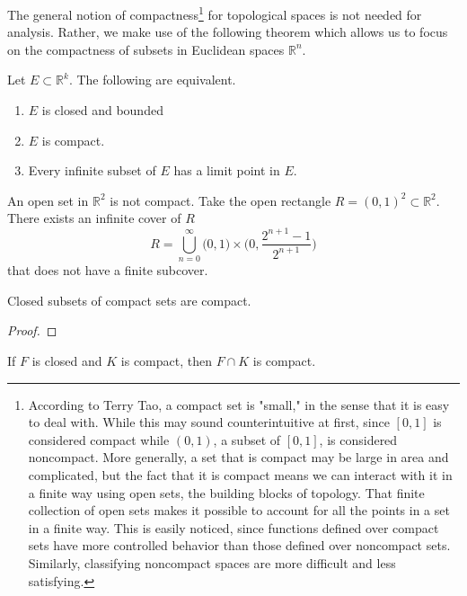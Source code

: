 \documentclass{article}
\begin{document}
    The general notion of compactness\footnote{According to Terry Tao, a compact set is "small," in the sense that it is easy to deal with. While this may sound counterintuitive at first, since $[0,1]$ is considered compact while $(0,1)$, a subset of $[0,1]$, is considered noncompact. More generally, a set that is compact may be large in area and complicated, but the fact that it is compact means we can interact with it in a finite way using open sets, the building blocks of topology. That finite collection of open sets makes it possible to account for all the points in a set in a finite way. This is easily noticed, since functions defined over compact sets have more controlled behavior than those defined over noncompact sets. Similarly, classifying noncompact spaces are more difficult and less satisfying. } for topological spaces is not needed for analysis. Rather, we make use of the following theorem which allows us to focus on the compactness of subsets in Euclidean spaces $\mathbb{R}^n$. 

    \begin{theorem}
      Let $E \subset \mathbb{R}^k$. The following are equivalent. 
      \begin{enumerate}
        \item $E$ is closed and bounded 
        \item $E$ is compact. 
        \item Every infinite subset of $E$ has a limit point in $E$. 
      \end{enumerate}
    \end{theorem}

    \begin{example}
      An open set in $\mathbb{R}^2$ is not compact. Take the open rectangle $ R = (0,1)^2 \subset \mathbb{R}^2$. There exists an infinite cover of $R$
      \[R = \bigcup_{n=0}^\infty \big(0,1\big) \times \bigg( 0, \frac{ 2^{n+1} - 1}{2^{n+1}} \bigg) \]
      that does not have a finite subcover. 
    \end{example}

    \begin{theorem}
      Closed subsets of compact sets are compact. 
    \end{theorem}
    \begin{proof}

    \end{proof}

    \begin{theorem}
    If $F$ is closed and $K$ is compact, then $F \cap K$ is compact. 
    \end{theorem}
\end{document}
